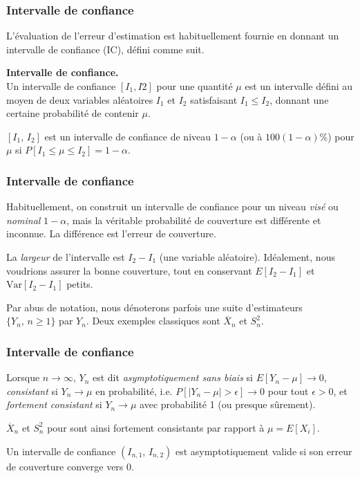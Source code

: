 \documentclass[t,usepdftitle=false]{beamer}
\def\Var{\mbox{Var}}
\begin{document}
\begin{frame}
\frametitle{Intervalle de confiance}

L'évaluation de l'erreur d'estimation est habituellement fournie 
en donnant un intervalle de confiance (IC), défini comme suit.

\mbox{}

{\bf Intervalle de confiance.}\\
Un intervalle de confiance $[I_1, I2]$ pour une quantité $\mu$ est un
intervalle défini au moyen de deux variables aléatoires $I_1$ et $I_2$
satisfaisant $I_1 \leq I_2$, donnant une certaine probabilité de
contenir $\mu$.

\mbox{}

$[{I_1},\, {I_2}]$ est un intervalle de confiance de niveau
$1-{\alpha}$ (ou à $100(1-\alpha)\%$) pour $\mu$ si $P[I_1\le \mu\le
I_2] = 1-\alpha$.

\end{frame}

\begin{frame}
\frametitle{Intervalle de confiance}

Habituellement, on construit un intervalle de confiance pour un niveau \emph{visé}
ou \emph{nominal} $1-\alpha$, mais la véritable probabilité de
couverture est différente et inconnue.
La différence est l'erreur de couverture.

\mbox{}

La \emph{largeur} de l'intervalle est $I_2-I_1$ (une variable
aléatoire).
Idéalement, nous voudrions assurer la bonne couverture, tout en conservant
$E[I_2-I_1]$ et $\Var[I_2-I_1]$ petits.

\mbox{}

Par abus de notation, nous dénoterons parfois une suite d'estimateurs $\{Y_n,\, n\ge 1\}$ par ${Y_n}$.
Deux exemples classiques sont $\overline{X}_n$ et $S_n^2$.

\end{frame}

\begin{frame}
\frametitle{Intervalle de confiance}

Lorsque $n\to\infty$, $Y_n$ est dit \emph{asymptotiquement sans biais} si
$E[Y_n - \mu] \to 0$,
\emph{consistant} si $Y_n \to \mu$ en probabilité,
i.e. $P[|Y_n-\mu| > \epsilon] \to 0$ pour tout $\epsilon > 0$,
et \emph{fortement consistant} si $Y_n \to \mu$ avec probabilité 1 (ou
presque sûrement).

\mbox{}

$\overline{X}_n$ et $S_n^2$ pour sont ainsi fortement consistants par
rapport à $\mu = E[X_i]$.

\mbox{}

Un intervalle de confiance $(I_{n,1},\, I_{n,2})$ est asymptotiquement valide si son erreur de couverture converge vers 0.

\end{frame}
\end{document}
